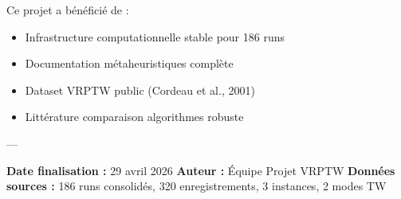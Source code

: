 \documentclass[12pt,a4paper,twoside]{report}
\begin{document}
Ce projet a bénéficié de :
\begin{itemize}
    \item Infrastructure computationnelle stable pour 186 runs
    \item Documentation métaheuristiques complète
    \item Dataset VRPTW public (Cordeau et al., 2001)
    \item Littérature comparaison algorithmes robuste
\end{itemize}

---

\textbf{Date finalisation :} 29 avril 2026
\textbf{Auteur :} Équipe Projet VRPTW
\textbf{Données sources :} 186 runs consolidés, 320 enregistrements, 3 instances, 2 modes TW
\end{document}
